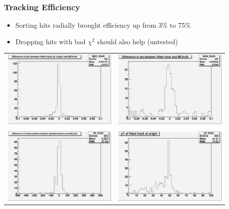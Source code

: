\documentclass[12pt,compress]{beamer}
\begin{document}
\begin{frame}
\frametitle{Tracking Efficiency}

\begin{itemize}
\item Sorting hits radially brought efficiency up from 3\% to 75\%
\item Dropping hits with bad $\chi^2$ should also help (untested)
\end{itemize}

\begin{center}
\begin{tabular}{p{0.45\linewidth} p{0.45\linewidth}}
\begin{minipage}{\linewidth}
\includegraphics[width=\linewidth, height=2.5 cm]{dphi_track}
\end{minipage} &
\begin{minipage}{\linewidth}
\includegraphics[width=\linewidth, height=2.5 cm]{deta_track}
\end{minipage} \\
& \\
\begin{minipage}{\linewidth}
\includegraphics[width=\linewidth, height=2.5 cm]{dz_track}
\end{minipage} &
\begin{minipage}{\linewidth}
\includegraphics[width=\linewidth, height=2.5 cm]{pt_track}
\end{minipage}
\end{tabular}
\end{center}
\end{frame}
\end{document}
